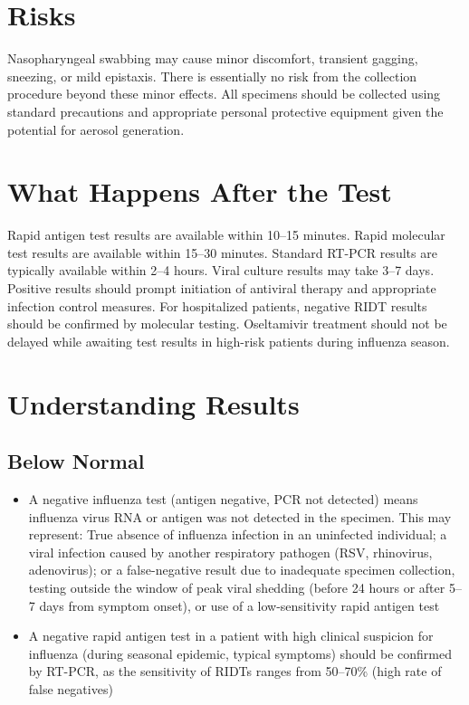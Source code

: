 \section*{Risks}
Nasopharyngeal swabbing may cause minor discomfort, transient gagging, sneezing, or mild epistaxis. There is essentially no risk from the collection procedure beyond these minor effects. All specimens should be collected using standard precautions and appropriate personal protective equipment given the potential for aerosol generation.

\section*{What Happens After the Test}
Rapid antigen test results are available within 10--15 minutes. Rapid molecular test results are available within 15--30 minutes. Standard RT-PCR results are typically available within 2--4 hours. Viral culture results may take 3--7 days. Positive results should prompt initiation of antiviral therapy and appropriate infection control measures. For hospitalized patients, negative RIDT results should be confirmed by molecular testing. Oseltamivir treatment should not be delayed while awaiting test results in high-risk patients during influenza season.

\section*{Understanding Results}

\subsection*{Below Normal}
\begin{itemize}
  \item A negative influenza test (antigen negative, PCR not detected) means influenza virus RNA or antigen was not detected in the specimen. This may represent: True absence of influenza infection in an uninfected individual; a viral infection caused by another respiratory pathogen (RSV, rhinovirus, adenovirus); or a false-negative result due to inadequate specimen collection, testing outside the window of peak viral shedding (before 24 hours or after 5--7 days from symptom onset), or use of a low-sensitivity rapid antigen test
  \item A negative rapid antigen test in a patient with high clinical suspicion for influenza (during seasonal epidemic, typical symptoms) should be confirmed by RT-PCR, as the sensitivity of RIDTs ranges from 50--70\% (high rate of false negatives)
\end{itemize}

